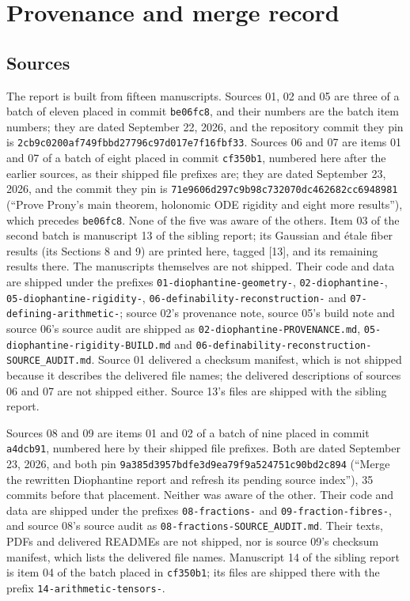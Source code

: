 \documentclass[11pt,oneside]{article}
\numberwithin{equation}{section}
\theoremstyle{definition}
\theoremstyle{remark}
\newcommand{\pin}{\texttt{2cb9c0200af749fbbd27796c97d017e7f16fbf33}}
\newcommand{\src}[1]{\textup{\textsf{\small[#1]}}}
\newcommand{\fn}[1]{\nolinkurl{#1}}
\begin{document}
\appendix

\section{Provenance and merge record}\label{odg:app:provenance}

\subsection{Sources}

The report is built from fifteen manuscripts. Sources 01, 02 and 05 are three of
a batch of eleven placed in commit \texttt{be06fc8}, and their numbers are the
batch item numbers; they are dated September 22, 2026, and the repository
commit they pin is \pin. Sources 06 and 07 are items 01 and 07 of a batch of
eight placed in commit \texttt{cf350b1}, numbered here after the earlier
sources, as their shipped file prefixes are; they are dated September 23,
2026, and the commit they pin is
\nolinkurl{71e9606d297c9b98c732070dc462682cc6948981} (``Prove Prony's main
theorem, holonomic ODE rigidity and eight more results''), which precedes
\texttt{be06fc8}. None of the five was aware of the others. Item 03 of the
second batch is manuscript 13 of the sibling report; its Gaussian and \'etale
fiber results (its Sections 8 and 9) are printed here, tagged \src{13}, and
its remaining results there. The manuscripts themselves are not shipped.
Their code and data are shipped under the prefixes
\fn{01-diophantine-geometry-}, \fn{02-diophantine-},
\fn{05-diophantine-rigidity-}, \fn{06-definability-reconstruction-} and
\fn{07-defining-arithmetic-}; source 02's provenance note, source 05's build
note and source 06's source audit are shipped as
\fn{02-diophantine-PROVENANCE.md}, \fn{05-diophantine-rigidity-BUILD.md} and
\fn{06-definability-reconstruction-SOURCE_AUDIT.md}. Source 01 delivered a
checksum manifest, which is not shipped because it describes the delivered
file names; the delivered descriptions of sources 06 and 07 are not shipped
either. Source 13's files are shipped with the sibling report.

Sources 08 and 09 are items 01 and 02 of a batch of nine placed in commit
\texttt{a4dcb91}, numbered here by their shipped file prefixes. Both are dated
September 23, 2026, and both pin
\nolinkurl{9a385d3957bdfe3d9ea79f9a524751c90bd2c894} (``Merge the rewritten
Diophantine report and refresh its pending source index''), 35 commits before
that placement. Neither was aware of the other. Their code and data are shipped
under the prefixes \fn{08-fractions-} and \fn{09-fraction-fibres-}, and source
08's source audit as \fn{08-fractions-SOURCE_AUDIT.md}. Their texts, PDFs and
delivered READMEs are not shipped, nor is source 09's checksum manifest, which
lists the delivered file names. Manuscript 14 of the sibling report is item 04
of the batch placed in \texttt{cf350b1}; its files are shipped there with the
prefix \fn{14-arithmetic-tensors-}.
\end{document}
